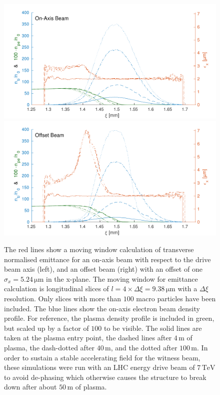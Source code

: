 \documentclass[aps,prstab,reprint,amsmath,amssymb,groupedaddress]{revtex4-1}
\newcommand{\unit}[1]{\,\mathrm{#1}}
\begin{document}
\begin{figure}[hbt]
    \includegraphics[width=0.495\linewidth,trim={2mm 0mm 2mm 0mm},clip]{figures/beamEmittance}
    \includegraphics[width=0.495\linewidth,trim={2mm 0mm 2mm 0mm},clip]{figures/beamEmittanceOffset}
    \caption{\label{Fig:BeamEmitt} The red lines show a moving window calculation of transverse normalised emittance for
        an on-axis beam with respect to the drive beam axis (left), and an offset beam (right) with an offset of one
        $\sigma_{x} = 5.24\unit{\mu m}$ in the x-plane. The moving window for emittance calculation is longitudinal
        slices of $l = 4\times\Delta\xi = 9.38\unit{\mu m}$ with a $\Delta\xi$ resolution. Only slices with more than
        $100$ macro particles have been included. The blue lines show the on-axis electron beam density profile. For
        reference, the plasma density profile is included in green, but scaled up by a factor of $100$ to be visible.
        The solid lines are taken at the plasma entry point, the dashed lines after $4\unit{m}$ of plasma, the
        dash-dotted after $40\unit{m}$, and the dotted after $100\unit{m}$. In order to sustain a stable accelerating
        field for the witness beam, these simulations were run with an LHC energy drive beam of $7\unit{TeV}$ to avoid
        de-phasing which otherwise causes the structure to break down after about $50\unit{m}$ of plasma.}
\end{figure}
\end{document}
